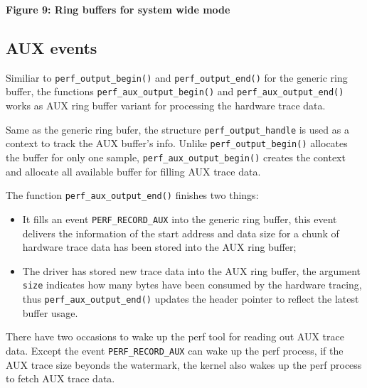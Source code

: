 \documentclass[11pt]{diazessay} %
\def\code#1{\texttt{#1}}
\begin{document}
\begin{center}
\par
\textbf{Figure 9: Ring buffers for system wide mode}
\end{center}

\subsection*{AUX events}

Similiar to \code{perf\_output\_begin()} and \code{perf\_output\_end()} for the generic ring buffer, the functions \code{perf\_aux\_output\_begin()} and \code{perf\_aux\_output\_end()} works as AUX ring buffer variant for processing the hardware trace data.

Same as the generic ring bufer, the structure \code{perf\_output\_handle} is used as a context to track the AUX buffer's info.  Unlike \code{perf\_output\_begin()} allocates the buffer for only one sample, \code{perf\_aux\_output\_begin()} creates the context and allocate all available buffer for filling AUX trace data.

The function \code{perf\_aux\_output\_end()} finishes two things:
\begin{itemize}
	\item It fills an event \code{PERF\_RECORD\_AUX} into the generic ring buffer, this event delivers the information of the start address and data size for a chunk of hardware trace data has been stored into the AUX ring buffer;
	\item The driver has stored new trace data into the AUX ring buffer, the argument \code{size} indicates how many bytes have been consumed by the hardware tracing, thus \code{perf\_aux\_output\_end()} updates the header pointer to reflect the latest buffer usage.
\end{itemize}

There have two occasions to wake up the perf tool for reading out AUX trace data.  Except the event \code{PERF\_RECORD\_AUX} can wake up the perf process, if the AUX trace size beyonds the watermark, the kernel also wakes up the perf process to fetch AUX trace data.
\end{document}
